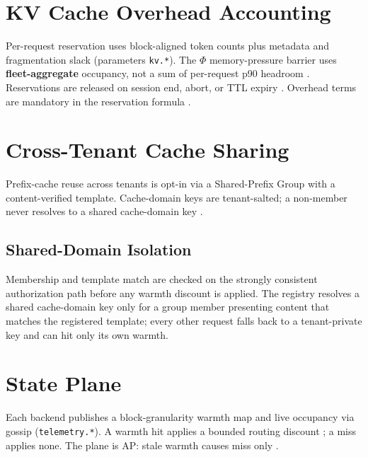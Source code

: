 \documentclass[11pt]{article}
\begin{document}
\begin{table}[h]
  \centering
  
  \caption{Canonical parameters (generated). Groups for future phases are
  placeholders until their roadmap phase lands.}
  \label{tab:params}
\end{table}

\section{KV Cache Overhead Accounting}\label{sec:kv}
Per-request reservation uses block-aligned token counts plus metadata and
fragmentation slack (parameters \texttt{kv.*}). The $\Phi$ memory-pressure
barrier uses \textbf{fleet-aggregate} occupancy, not a sum of per-request p90
headroom . Reservations are released on session end, abort,
or TTL expiry . Overhead terms are mandatory in the
reservation formula .

\section{Cross-Tenant Cache Sharing}\label{sec:sharing}
Prefix-cache reuse across tenants is opt-in via a Shared-Prefix Group with a
content-verified template. Cache-domain keys are tenant-salted; a non-member
never resolves to a shared cache-domain key .

\subsection{Shared-Domain Isolation}\label{sec:sharing-s1}
Membership and template match are checked on the strongly consistent
authorization path before any warmth discount is applied. The registry resolves
a shared cache-domain key only for a group member presenting content that
matches the registered template; every other request falls back to a
tenant-private key and can hit only its own warmth.

\section{State Plane}\label{sec:state}
Each backend publishes a block-granularity warmth map and live occupancy via
gossip (\texttt{telemetry.*}). A warmth hit applies a bounded routing discount
; a miss applies none. The plane is AP: stale warmth
causes miss only .
\end{document}
